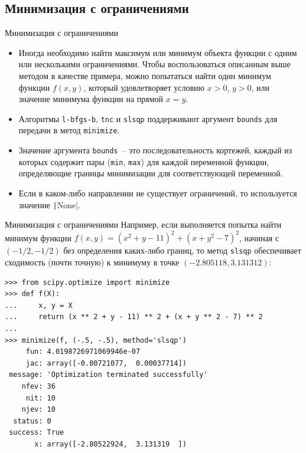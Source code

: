 \documentclass[aspectratio=169, mathserif]{beamer}	%
\begin{document}
\subsection{Минимизация с ограничениями}
\begin{frame}[fragile]{Минимизация с ограничениями}
\scriptsize
\begin{itemize}
\item Иногда необходимо найти максимум или минимум объекта функции с одним или несколькими ограничениями. Чтобы воспользоваться описанным выше методом в качестве примера, можно попытаться найти один минимум функции $f(x,y)$, который удовлетворяет условию $x > 0$, $y > 0$, или значение минимума функции на прямой $x = y$.
\item Алгоритмы \texttt{l-bfgs-b}, \texttt{tnc} и \texttt{slsqp} поддерживают аргумент \texttt{bounds} для передачи в метод \texttt{minimize}.
\item Значение аргумента \texttt{bounds}~-- это последовательность
кортежей, каждый из которых содержит пары (\texttt{min}, \texttt{max}) для каждой переменной функции, определяющие границы минимизации для соответствующей переменной.
\item Если в каком-либо направлении не существует ограничений, то используется значение \texttt|None|.
\end{itemize}
\vfill
\end{frame}


\begin{frame}[fragile]{Минимизация с ограничениями}
\scriptsize
Например, если выполняется попытка найти минимум функции $f\left(x, y\right) = \left(x^2 + y - 11\right)^2 + \left(x + y^2 - 7\right)^2$, начиная с $\left(−1/2, −1/2\right)$ без определения каких-либо границ, то метод \texttt{slsqp} обеспечивает сходимость (почти точную) к минимуму в точке $(−2.805118, 3.131312)$:
\vfill
\begin{verbatim}
>>> from scipy.optimize import minimize
>>> def f(X):
...     x, y = X
...     return (x ** 2 + y - 11) ** 2 + (x + y ** 2 - 7) ** 2
...
>>> minimize(f, (-.5, -.5), method='slsqp')
     fun: 4.0198726971069946e-07
     jac: array([-0.00721077,  0.00037714])
 message: 'Optimization terminated successfully'
    nfev: 36
     nit: 10
    njev: 10
  status: 0
 success: True
       x: array([-2.80522924,  3.131319  ])
\end{verbatim}
\vfill
\end{frame}
\end{document}
